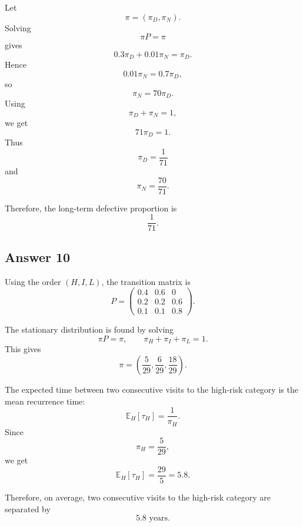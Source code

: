 \documentclass[12pt,a4paper]{article}
\theoremstyle{lecturestyle}
\newcommand{\E}{\mathbb{E}}
\begin{document}
Let
\[
\pi=(\pi_D,\pi_N).
\]
Solving
\[
\pi P=\pi
\]
gives
\[
0.3\pi_D+0.01\pi_N=\pi_D.
\]
Hence
\[
0.01\pi_N=0.7\pi_D,
\]
so
\[
\pi_N=70\pi_D.
\]
Using
\[
\pi_D+\pi_N=1,
\]
we get
\[
71\pi_D=1.
\]
Thus
\[
\pi_D=\frac1{71}
\]
and
\[
\pi_N=\frac{70}{71}.
\]

Therefore, the long-term defective proportion is
\[
\frac1{71}.
\]

\subsection*{Answer 10}

Using the order $(H,I,L)$, the transition matrix is
\[
P=
\begin{pmatrix}
0.4 & 0.6 & 0\\
0.2 & 0.2 & 0.6\\
0.1 & 0.1 & 0.8
\end{pmatrix}.
\]

The stationary distribution is found by solving
\[
\pi P=\pi,
\qquad
\pi_H+\pi_I+\pi_L=1.
\]
This gives
\[
\pi=\left(\frac5{29},\frac6{29},\frac{18}{29}\right).
\]

The expected time between two consecutive visits to the high-risk category is the mean recurrence time:
\[
\E_H[\tau_H]=\frac1{\pi_H}.
\]
Since
\[
\pi_H=\frac5{29},
\]
we get
\[
\E_H[\tau_H]=\frac{29}{5}=5.8.
\]

Therefore, on average, two consecutive visits to the high-risk category are separated by
\[
\boxed{5.8\text{ years}.}
\]
\end{document}
